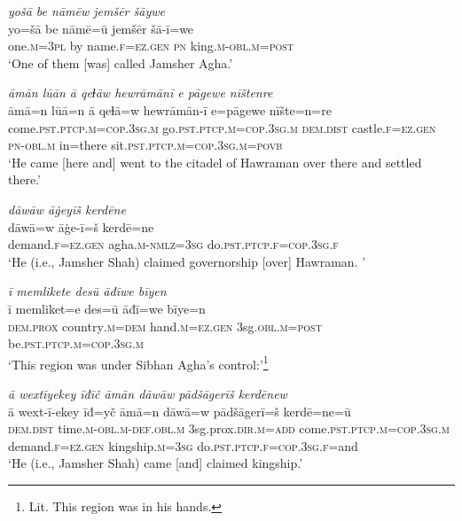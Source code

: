 \ea \label{DP.3}
\textit{yošā be nāmēw jemšēr šāywe} \\ 
\gll yo=šā be nāmē=ū jemšēr šā-ī=we \\ 
 one\textsc{.m}\textsc{=3pl} by name\textsc{\textsc{.f}}\textsc{=ez}\textsc{.gen} \textsc{pn} king\textsc{.m}\textsc{-obl}\textsc{.m}\textsc{=\textsc{post}} \\ 
\glt `One of them [was] called Jamsher Agha.'
\z 
 
\ea \label{DP.9}
\textit{āmān lūān ā qeɫāw hewrāmānī e pāgewe nīštenre} \\ 
\gll āmā=n lūā=n ā qeɫā=w hewrāmān-ī e=pāgewe nīšte=n=re \\ 
 come\textsc{.pst}\textsc{.ptcp}\textsc{.m}\textsc{=cop}\textsc{.3sg}\textsc{.m} go\textsc{.pst}\textsc{.ptcp}\textsc{.m}\textsc{=cop}\textsc{.3sg}\textsc{.m} \textsc{dem.dist} castle\textsc{\textsc{.f}}\textsc{=ez}\textsc{.gen} \textsc{pn}\textsc{-obl}\textsc{.m} in=there sit\textsc{.pst}\textsc{.ptcp}\textsc{.m}\textsc{=cop}\textsc{.3sg}\textsc{.m}\textsc{=\textsc{povb}} \\ 
\glt `He came [here and] went to the citadel of Hawraman over there and settled there.'
\z 
 
\ea \label{DP.13}
\textit{dāwāw āġeyīš kerdēne} \\ 
\gll dāwā=w āġe-ī=š kerdē=ne \\ 
 demand\textsc{\textsc{.f}}\textsc{=ez}\textsc{.gen} agha\textsc{.m}\textsc{-nmlz}\textsc{=3sg} do\textsc{.pst}\textsc{.ptcp}\textsc{\textsc{.f}}\textsc{=cop}\textsc{.3sg}\textsc{\textsc{.f}} \\ 
\glt `He (i.e., Jamsher Shah) claimed governorship [over] Hawraman. '
\z 
 
\ea \label{DP.14}
\textit{ī memlikete desū āđīwe bīyen} \\ 
\gll ī memliket=e des=ū āđī=we bīye=n \\ 
 \textsc{dem.prox} country\textsc{.m}\textsc{=dem} hand\textsc{.m}\textsc{=ez}\textsc{.gen} 3sg\textsc{.obl}\textsc{.m}\textsc{=\textsc{post}} be\textsc{.pst}\textsc{.ptcp}\textsc{.m}\textsc{=cop}\textsc{.3sg}\textsc{.m} \\ 
\glt `This region was under Sibhan Agha’s control:'\footnote{Lit. This region was in his hands.}
\z 
 
\ea \label{DP.17}
\textit{ā wextīyekey īđīč āmān dāwāw pādšāgerīš kerdēnew} \\ 
\gll ā wext-ī-ekey īđ=yč āmā=n dāwā=w pādšāgerī=š kerdē=ne=ū \\ 
 \textsc{dem.dist} time\textsc{.m}\textsc{-obl}\textsc{.m}\textsc{-def}\textsc{.obl}\textsc{.m} 3sg.prox\textsc{.dir}\textsc{.m}\textsc{=add} come\textsc{.pst}\textsc{.ptcp}\textsc{.m}\textsc{=cop}\textsc{.3sg}\textsc{.m} demand\textsc{\textsc{.f}}\textsc{=ez}\textsc{.gen} kingship\textsc{.m}\textsc{=3sg} do\textsc{.pst}\textsc{.ptcp}\textsc{\textsc{.f}}\textsc{=cop}\textsc{.3sg}\textsc{\textsc{.f}}=and \\ 
\glt `He (i.e., Jamsher Shah) came [and] claimed kingship.'
\z 
 
